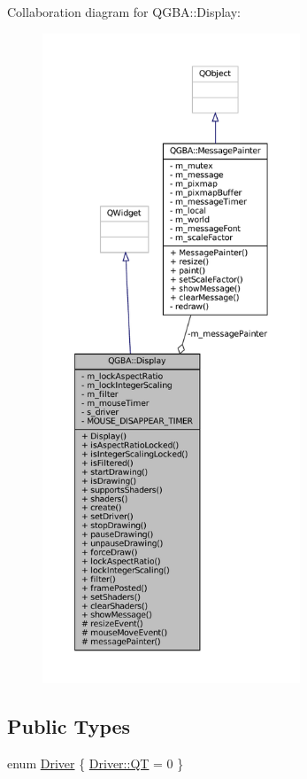 Collaboration diagram for Q\+G\+BA\+:\+:Display\+:
\nopagebreak
\begin{figure}[H]
\begin{center}
\leavevmode
\includegraphics[height=550pt]{class_q_g_b_a_1_1_display__coll__graph}
\end{center}
\end{figure}
\subsection*{Public Types}
\begin{DoxyCompactItemize}
\item 
enum \mbox{\hyperlink{class_q_g_b_a_1_1_display_a43f4be6bd7830df1380fcc10165488d0}{Driver}} \{ \mbox{\hyperlink{class_q_g_b_a_1_1_display_a43f4be6bd7830df1380fcc10165488d0a33b8d767c1f7c7984d900797e2bb7727}{Driver\+::\+QT}} = 0
 \}
\end{DoxyCompactItemize}
